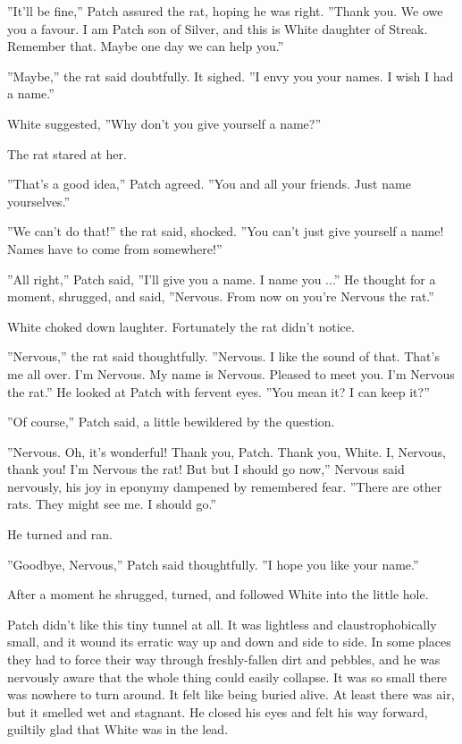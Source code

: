 \documentclass[12pt]{book}
\begin{document}
 ''It'll be fine,'' Patch assured the rat, hoping he was right. ''Thank you. We owe you a favour. I am Patch son of Silver, and this is White daughter of Streak. Remember that. Maybe one day we can help you.''\par
 ''Maybe,'' the rat said doubtfully. It sighed. ''I envy you your names. I wish I had a name.''\par
 White suggested, ''Why don't you give yourself a name?''\par
 The rat stared at her.\par
 ''That's a good idea,'' Patch agreed. ''You and all your friends. Just name yourselves.''\par
 ''We can't do that!'' the rat said, shocked. ''You can't just give yourself a name! Names have to come from somewhere!''\par
 ''All right,'' Patch said, ''I'll give you a name. I name you ...'' He thought for a moment, shrugged, and said, ''Nervous. From now on you're Nervous the rat.''\par
 White choked down laughter. Fortunately the rat didn't notice.\par
 ''Nervous,'' the rat said thoughtfully. ''Nervous. I like the sound of that. That's me all over. I'm Nervous. My name is Nervous. Pleased to meet you. I'm Nervous the rat.'' He looked at Patch with fervent eyes. ''You mean it? I can keep it?''\par
 ''Of course,'' Patch said, a little bewildered by the question.\par
 ''Nervous. Oh, it's wonderful! Thank you, Patch. Thank you, White. I, Nervous, thank you! I'm Nervous the rat! But %
 but I should go now,'' Nervous said nervously, his joy in eponymy dampened by remembered fear. ''There are other rats. They might see me. I should go.''\par
 He turned and ran.\par
 ''Goodbye, Nervous,'' Patch said thoughtfully. ''I hope you like your name.''\par
 After a moment he shrugged, turned, and followed White into the little hole.\par
 Patch didn't like this tiny tunnel at all. It was lightless and claustrophobically small, and it wound its erratic way up and down and side to side. In some places they had to force their way through freshly-fallen dirt and pebbles, and he was nervously aware that the whole thing could easily collapse. It was so small there was nowhere to turn around. It felt like being buried alive. At least there was air, but it smelled wet and stagnant. He closed his eyes and felt his way forward, guiltily glad that White was in the lead.\par
\end{document}
